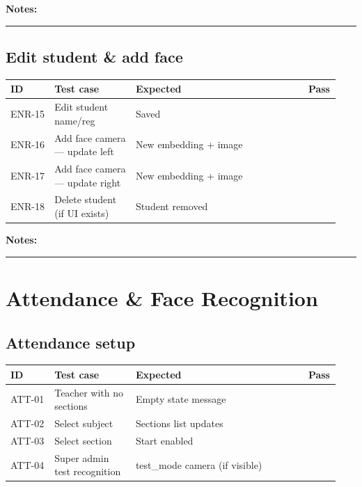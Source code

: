 \documentclass[11pt,a4paper,oneside]{article}
\newcommand{\chk}{\fbox{\rule{0pt}{1.05ex}\rule{1.05ex}{0pt}}}
\newcommand{\fillinlong}{\rule{0.72\textwidth}{0.4pt}}
\newcommand{\notesblock}{\par\smallskip\noindent\textbf{Notes:}\ \fillinlong\par\smallskip}
\newcommand{\tcheadfour}{%
  \toprule
  \textbf{ID} & \textbf{Test case} & \textbf{Expected} & \textbf{Pass} \\
  \midrule
}
\begin{document}
\notesblock

\subsection{Edit student \& add face}

\small
\begin{tabular}{@{}>{\raggedright\arraybackslash}p{0.13\linewidth} >{\raggedright\arraybackslash}p{0.24\linewidth} >{\raggedright\arraybackslash}p{0.51\linewidth} >{\centering\arraybackslash}p{0.06\linewidth}@{}}
  \tcheadfour
  ENR-15 & Edit student name/reg          & Saved                         & \chk \\
  ENR-16 & Add face camera — update left  & New embedding + image         & \chk \\
  ENR-17 & Add face camera — update right & New embedding + image         & \chk \\
  ENR-18 & Delete student (if UI exists)  & Student removed               & \chk \\
  \bottomrule
\end{tabular}
\normalsize

\notesblock

\section{Attendance \& Face Recognition}

\subsection{Attendance setup}

\small
\begin{tabular}{@{}>{\raggedright\arraybackslash}p{0.13\linewidth} >{\raggedright\arraybackslash}p{0.24\linewidth} >{\raggedright\arraybackslash}p{0.51\linewidth} >{\centering\arraybackslash}p{0.06\linewidth}@{}}
  \tcheadfour
  ATT-01 & Teacher with no sections       & Empty state message              & \chk \\
  ATT-02 & Select subject                 & Sections list updates            & \chk \\
  ATT-03 & Select section                 & Start enabled                    & \chk \\
  ATT-04 & Super admin test recognition   & test\_mode camera (if visible)   & \chk \\
  \bottomrule
\end{tabular}
\normalsize
\end{document}

